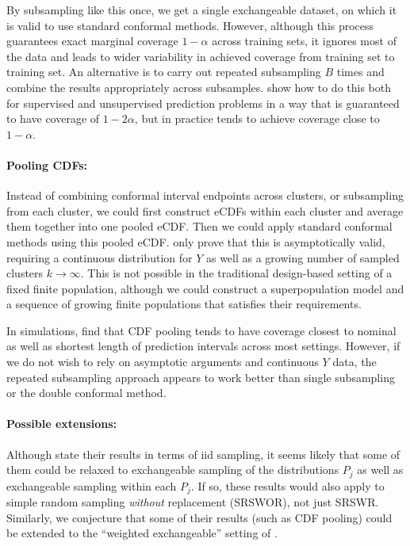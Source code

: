 \documentclass[10.5pt, letterpaper]{article}
\numberwithin{table}{section}
\numberwithin{figure}{section}
\numberwithin{equation}{section}
\begin{document}
By subsampling like this once, we get a single exchangeable dataset, on which it is valid to use standard conformal methods. However, although this process guarantees exact marginal coverage $1-\alpha$ across training sets, it ignores most of the data and leads to wider variability in achieved coverage from training set to training set. An alternative is to carry out repeated subsampling $B$ times and combine the results appropriately across subsamples. \cite{dunn2022distribution} show how to do this both for supervised and unsupervised prediction problems in a way that is guaranteed to have coverage of $1-2\alpha$, but in practice tends to achieve coverage close to $1-\alpha$.

\paragraph{Pooling CDFs:} Instead of combining conformal interval endpoints across clusters, or subsampling from each cluster, we could first construct eCDFs within each cluster and average them together into one pooled eCDF. Then we could apply standard conformal methods using this pooled eCDF. \cite{dunn2022distribution} only prove that this is asymptotically valid, requiring a continuous distribution for $Y$ as well as a growing number of sampled clusters $k \rightarrow \infty$. This is not possible in the traditional design-based setting of a fixed finite population, although we could construct a superpopulation model and a sequence of growing finite populations that satisfies their requirements.

In simulations, \cite{dunn2022distribution} find that CDF pooling tends to have coverage closest to nominal as well as shortest length of prediction intervals across most settings. However, if we do not wish to rely on asymptotic arguments and continuous $Y$ data, the repeated subsampling approach appears to work better than single subsampling or the double conformal method.

\paragraph{Possible extensions:} Although \cite{dunn2022distribution} state their results in terms of iid sampling, it seems likely that some of them could be relaxed to exchangeable sampling of the distributions $P_j$ as well as exchangeable sampling within each $P_j$. If so, these results would also apply to simple random sampling \emph{without} replacement (SRSWOR), not just SRSWR. Similarly, we conjecture that some of their results (such as CDF pooling) could be extended to the ``weighted exchangeable'' setting of \cite{tibshirani2019conformal}.
\end{document}
